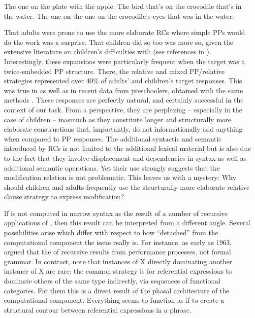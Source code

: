 \documentclass[output=paper]{langsci/langscibook}
\begin{document}
\ea\label{ex:key:4}
    \ea\label{ex:key:4a} The one on the plate with the apple.
    \ex\label{ex:key:4b} The bird that’s on the crocodile that’s in the water.
    \ex\label{ex:key:4c} The one on the one on the crocodile’s eyes that was in the   water.
    \z
\z

That adults were prone to use the more elaborate \glspl{RC} where simple PPs
would do the work was a surprise. That children did so too was more so, given
the extensive literature on children’s difficulties with 
(see references in \citealt{FriedmannEtAl2009,Givon2009}). Interestingly, these
expansions were particularly frequent when the target was a twice-embedded PP
structure.  There, the relative and mixed PP/relative strategies represented over
40\% of adults’ and children’s target responses. This was true in  as
well as in recent data from  preschoolers, obtained with the same methods
\citep{Lowles2016}. These responses are perfectly natural, and certainly
successful in the context of our task. From a  perspective,
they are perplexing -- especially in the case of children -- inasmuch as they
constitute longer and structurally more elaborate constructions that,
importantly, do not informationally add anything when compared to PP responses.
The additional syntactic and semantic  introduced by \glspl{RC}
is not limited to the additional lexical material but is also due to the fact
that they involve displacement and dependencies in syntax as well as additional
semantic operations. Yet their use strongly suggests that the modification
relation is not problematic. This leaves us with a mystery: Why should children
and adults frequently use the structurally more elaborate relative clause
strategy to express modification?

If  is not computed in narrow syntax as the result of a number of
recursive applications of , then this result can be interpreted from
a different angle. Several possibilities arise which differ with respect to
how \enquote{detached} from the computational component the  issue
really is. For instance, as early as 1963, \citeauthor{ChoMil1963} argued that
the  of recursive  results
from performance processes, not formal grammar.  In contrast, \citet{ArsHin2012}
note that instances of X directly dominating another instance of X are rare:
the common strategy is for referential expressions to dominate others of the
same type indirectly, via sequences of functional categories. For them this is
a direct result of the phasal architecture of the computational component.
Everything seems to function as if to create a structural contour between
referential expressions in a phrase.
\end{document}
